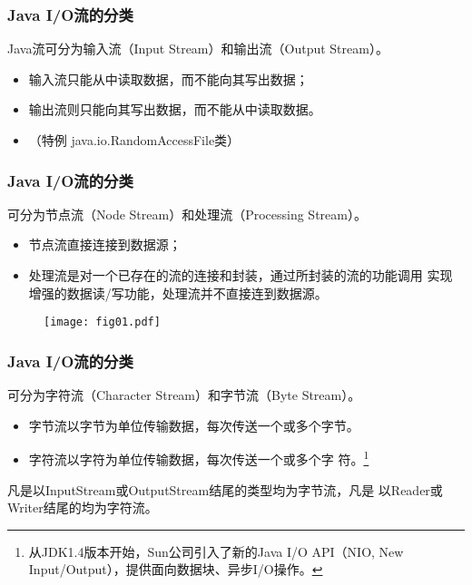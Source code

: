 \begin{frame}[fragile] %
  \frametitle{Java I/O流的分类}


  {\hei Java流可分为输入流（Input Stream）和输出流（Output Stream）。}

  \begin{itemize}
  \item 输入流只能从中读取数据，而不能向其写出数据；
  \item 输出流则只能向其写出数据，而不能从中读取数据。
  \item {\Mage （特例 java.io.RandomAccessFile类）}
  \end{itemize}
\end{frame}

\begin{frame}[fragile] %
  \frametitle{Java I/O流的分类}


  {\hei 可分为节点流（Node Stream）和处理流（Processing Stream）。}

  \begin{itemize}
  \item 节点流直接连接到数据源；
  \item 处理流是对一个已存在的流的连接和封装，通过所封装的流的功能调用
    实现增强的数据读/写功能，处理流并不直接连到数据源。
  \end{itemize}

  \begin{figure}
    \centering
    \texttt{[image: fig01.pdf]}
  \end{figure}
\end{frame}

\begin{frame}[fragile] %
  \frametitle{Java I/O流的分类}


  {\hei 可分为字符流（Character Stream）和字节流（Byte
    Stream）。}

  \begin{itemize}
  \item 字节流以字节为单位传输数据，每次传送一个或多个字节。
  \item 字符流以字符为单位传输数据，每次传送一个或多个字
    符。\footnote{从JDK1.4版本开始，Sun公司引入了新的Java I/O
      API（NIO, New Input/Output），提供面向数据块、异步I/O操作。}
\end{itemize}

  凡是以InputStream或OutputStream结尾的类型均为{\hei 字节流}，凡是
  以Reader或Writer结尾的均为{\hei 字符流。}
\end{frame}

